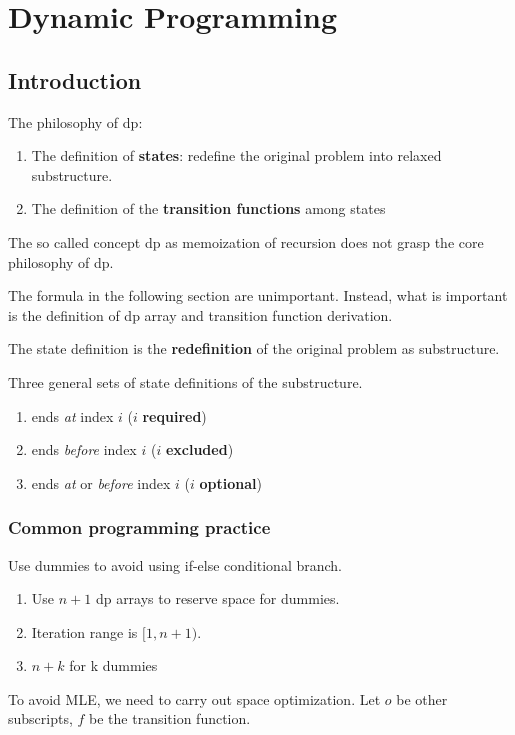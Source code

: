 \chapter{Dynamic Programming}



\section{Introduction}
The philosophy of dp:
\begin{enumerate}
\item The definition of \textbf{states}: redefine the original problem into relaxed substructure. 
\item The definition of the \textbf{transition functions} among states 
\end{enumerate} 

The so called concept dp as memoization of recursion does not grasp the core philosophy of dp. 

The formula in the following section are unimportant. Instead, what is important is the definition of dp array and transition function derivation.

 The state definition is the \textbf{redefinition} of the original problem as substructure. 

Three general sets of state definitions of the substructure. 
\begin{enumerate}
\item ends \textit{at} index $i$ ($i$ \textbf{required})
\item ends \textit{before} index $i$ ($i$ \textbf{excluded})
\item ends \textit{at} or \textit{before} index $i$ ($i$ \textbf{optional})
\end{enumerate}
\subsection{Common programming practice}
 Use dummies to avoid using if-else conditional branch.
\begin{enumerate}
\item Use $n+1$ dp arrays to reserve space for dummies. 
\item Iteration range is $[1, n+1)$.
\item $n+k$ for k dummies  
\end{enumerate}


 To avoid MLE, we need to carry out space optimization. Let $o$ be other subscripts, $f$ be the transition function. 


